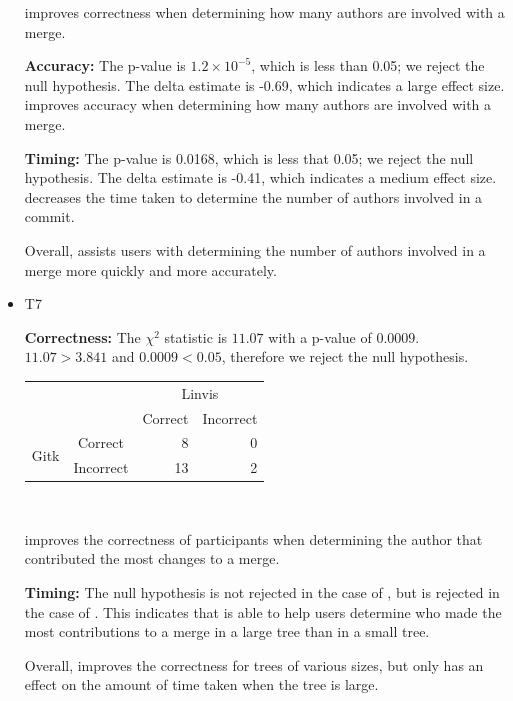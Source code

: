 \begin{itemize}
    \tool improves correctness when determining how many authors are
    involved with a merge.

    \textbf{Accuracy:} The p-value is $1.2 \times 10^{-5}$, which is
    less than 0.05; we reject the null hypothesis. The delta estimate is
    -0.69, which indicates a large effect size. \tool improves accuracy
    when determining how many authors are involved with a merge.

    \textbf{Timing:} The p-value is 0.0168, which is less that 0.05; we
    reject the null hypothesis. The delta estimate is -0.41, which
    indicates a medium effect size. \tool decreases the time taken to
    determine the number of authors involved in a commit.

    Overall, \tool assists users with determining the number of authors
    involved in a merge more quickly and more accurately.

  \item T7

    \textbf{Correctness:}
    The $\chi^2$ statistic is $11.07$ with a p-value of $0.0009$.
    $11.07 > 3.841$ and $0.0009 < 0.05$, therefore we reject the null
    hypothesis.
    \vspace{2mm}
    \begin{tabular}{cc|rr}
      &           & \multicolumn{2}{c}{Linvis}\\
      &           & Correct                      & Incorrect\\\hline
      \multirow{2}{*}{Gitk} & Correct   & 8                            & 0\\
      & Incorrect & 13                           & 2\\
    \end{tabular}\\
    \vspace{3mm}

    \tool improves the correctness of participants when determining the
    author that contributed the most changes to a merge.

    \textbf{Timing:} The null hypothesis is not rejected in the case of
    \comA, but is rejected in the case of \comB. This indicates that
    \tool is able to help users determine who made the most
    contributions to a merge in a large tree than in a small tree.

    Overall, \tool improves the correctness for trees of various sizes,
    but only has an effect on the amount of time taken when the tree is
    large.


\end{itemize}
